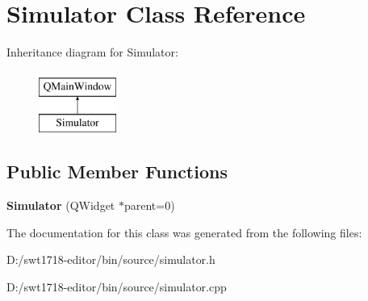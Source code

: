 \hypertarget{class_simulator}{}\section{Simulator Class Reference}
\label{class_simulator}
Inheritance diagram for Simulator\+:\begin{figure}[H]
\begin{center}
\leavevmode
\includegraphics[height=2.000000cm]{class_simulator}
\end{center}
\end{figure}
\subsection*{Public Member Functions}
\begin{DoxyCompactItemize}
\item 
\mbox{\label{class_simulator_abcf75e96d87dccb8eb87f6ded0c2d46f}} 
{\bfseries Simulator} (Q\+Widget $\ast$parent=0)
\end{DoxyCompactItemize}


The documentation for this class was generated from the following files\+:\begin{DoxyCompactItemize}
\item 
D\+:/swt1718-\/editor/bin/source/simulator.\+h\item 
D\+:/swt1718-\/editor/bin/source/simulator.\+cpp\end{DoxyCompactItemize}
